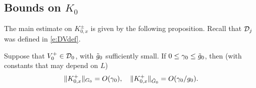 

\subsection{Bounds on \texorpdfstring{$K_0$}{K0}}
\label{sec:K0bds}

The main estimate on $K^\pm_{0,x}$ is given by the following proposition.
Recall that $\mathcal{D}_j$ was defined in \eqref{e:DVdef}.

\begin{prop}
\label{prop:K0bd}
Suppose that $V^+_0 \in \mathcal{D}_0$, with $\tilde{g}_0$ sufficiently small.
If $0 \le \gamma_0 \le \tilde{g}_0$, then
(with constants that may depend on $L$)
\begin{equation}
\lbeq{K0bds}
\|K^\pm_{0,x}\|_{G_0} = O(\gamma_0),
\quad
\|K^\pm_{0,x}\|_{\tilde G_0} = O(\gamma_0/g_0).
\end{equation}
\end{prop}


